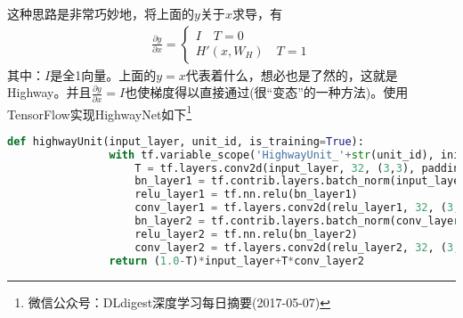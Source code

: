             这种思路是非常巧妙地，将上面的$y$关于$x$求导，有
            \begin{align*}
            \frac{\partial y}{\partial x} =
            \left\{
            \begin{aligned}
            I \quad T=0\\
            H'(x,W_H) \quad T=1
            \end{aligned}
            \right.
            \end{align*}
            其中：$I$是全1向量。上面的$y = x$代表着什么，想必也是了然的，这就是Highway。并且$\frac{\partial y}{\partial x} = I$也使梯度得以直接通过(很“变态”的一种方法)。使用TensorFlow实现HighwayNet如下\footnote{微信公众号：DLdigest深度学习每日摘要(2017-05-07)}
            \begin{lstlisting}[language = Python]
            def highwayUnit(input_layer, unit_id, is_training=True):
                with tf.variable_scope('HighwayUnit_'+str(unit_id), initializer=tf.random_normal_initializer()):
                    T = tf.layers.conv2d(input_layer, 32, (3,3), padding='same')
                    bn_layer1 = tf.contrib.layers.batch_norm(input_layer, is_training=is_training)
                    relu_layer1 = tf.nn.relu(bn_layer1)
                    conv_layer1 = tf.layers.conv2d(relu_layer1, 32, (3,3), padding='same')
                    bn_layer2 = tf.contrib.layers.batch_norm(conv_layer1, is_training=is_training)
                    relu_layer2 = tf.nn.relu(bn_layer2)
                    conv_layer2 = tf.layers.conv2d(relu_layer2, 32, (3,3), padding='same')
                return (1.0-T)*input_layer+T*conv_layer2
            \end{lstlisting}

